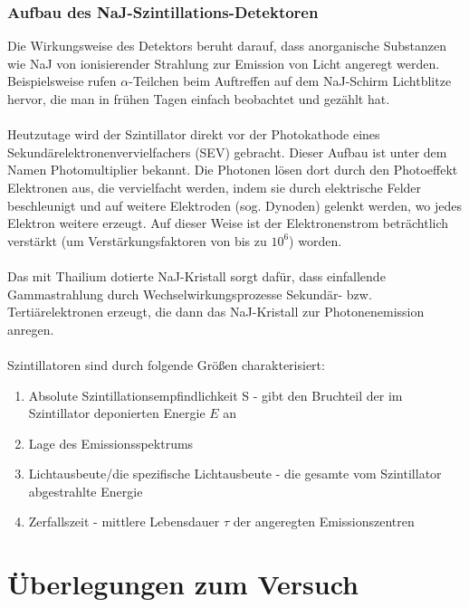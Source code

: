 \documentclass[a4paper,titlepage]{scrartcl}
\numberwithin{equation}{section}
\begin{document}
\subsubsection{Aufbau des NaJ-Szintillations-Detektoren}
Die Wirkungsweise des Detektors beruht darauf, dass anorganische Substanzen wie NaJ von ionisierender Strahlung zur Emission von Licht angeregt werden. Beispielsweise rufen $\alpha$-Teilchen beim Auftreffen auf dem NaJ-Schirm Lichtblitze hervor, die man in frühen Tagen einfach beobachtet und gezählt hat.\\ \\
Heutzutage wird der Szintillator direkt vor der Photokathode eines Sekundärelektronenvervielfachers (SEV) gebracht. Dieser Aufbau ist unter dem Namen Photomultiplier bekannt. Die Photonen lösen dort durch den Photoeffekt Elektronen aus, die vervielfacht werden, indem sie durch elektrische Felder beschleunigt und auf weitere Elektroden (sog. Dynoden) gelenkt werden, wo jedes Elektron weitere erzeugt. Auf dieser Weise ist der Elektronenstrom beträchtlich verstärkt (um Verstärkungsfaktoren von bis zu $10^6$) worden.\\ \\
Das mit Thailium dotierte NaJ-Kristall sorgt dafür, dass einfallende Gammastrahlung durch Wechselwirkungsprozesse Sekundär- bzw. Tertiärelektronen erzeugt, die dann das NaJ-Kristall zur Photonenemission anregen.\\ \\
Szintillatoren sind durch folgende Größen charakterisiert:
\begin{enumerate}
\item Absolute Szintillationsempfindlichkeit S - gibt den Bruchteil der im Szintillator deponierten Energie $E$ an
\item Lage des Emissionsspektrums
\item Lichtausbeute/die spezifische Lichtausbeute - die gesamte vom Szintillator abgestrahlte Energie
\item Zerfallszeit - mittlere Lebensdauer $\tau$ der angeregten Emissionszentren
\end{enumerate}
\section{Überlegungen zum Versuch}
\end{document}

